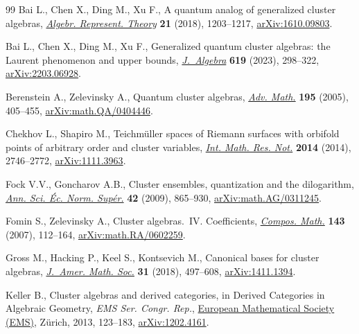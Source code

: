 \documentclass[11pt]{article}
\numberwithin{equation}{section}
\numberwithin{equation}{section}
\begin{document}
\begin{thebibliography}{99}
Bai L., Chen X., Ding M., Xu F., A quantum analog of generalized cluster
  algebras, \href{https://doi.org/10.1007/s10468-017-9743-7}{\textit{Algebr. Represent. Theory}} \textbf{21} (2018), 1203--1217,
  \href{https://arxiv.org/abs/1610.09803}{arXiv:1610.09803}.

Bai L., Chen X., Ding M., Xu F., Generalized quantum cluster algebras: the
  {L}aurent phenomenon and upper bounds, \href{https://doi.org/10.1016/j.jalgebra.2022.12.012}{\textit{J.~Algebra}} \textbf{619}
  (2023), 298--322, \href{https://arxiv.org/abs/2203.06928}{arXiv:2203.06928}.

Berenstein A., Zelevinsky A., Quantum cluster algebras, \href{https://doi.org/10.1016/j.aim.2004.08.003}{\textit{Adv. Math.}}
  \textbf{195} (2005), 405--455, \href{https://arxiv.org/abs/math.QA/0404446}{arXiv:math.QA/0404446}.

Chekhov L., Shapiro M., Teichm\"uller spaces of {R}iemann surfaces with
  orbifold points of arbitrary order and cluster variables,  \href{https://doi.org/10.1093/imrn/rnt016}{\textit{Int. Math.
  Res. Not.}} \textbf{2014} (2014), 2746--2772, \href{https://arxiv.org/abs/1111.3963}{arXiv:1111.3963}.

Fock V.V., Goncharov A.B., Cluster ensembles, quantization and the dilogarithm,
   \href{https://doi.org/10.24033/asens.2112}{\textit{Ann. Sci. \'Ec. Norm. Sup\'er.}} \textbf{42} (2009), 865--930,
  \href{https://arxiv.org/abs/math.AG/0311245}{arXiv:math.AG/0311245}.

Fomin S., Zelevinsky A., Cluster algebras.~{IV}. {C}oefficients,
  \href{https://doi.org/10.1112/S0010437X06002521}{\textit{Compos. Math.}} \textbf{143} (2007), 112--164,
  \href{https://arxiv.org/abs/math.RA/0602259}{arXiv:math.RA/0602259}.

Gross M., Hacking P., Keel S., Kontsevich M., Canonical bases for cluster
  algebras,  \href{https://doi.org/10.1090/jams/890}{\textit{J.~Amer. Math. Soc.}} \textbf{31} (2018), 497--608,
  \href{https://arxiv.org/abs/1411.1394}{arXiv:1411.1394}.

Keller B., Cluster algebras and derived categories, in Derived {C}ategories in
  {A}lgebraic {G}eometry, \textit{EMS Ser. Congr. Rep.},  \href{https://doi.org/10.4171/115-1/6}{European Mathematical Society (EMS)}, Z\"urich, 2013, 123--183, \href{https://arxiv.org/abs/1202.4161}{arXiv:1202.4161}.


\end{thebibliography}
\end{document}
